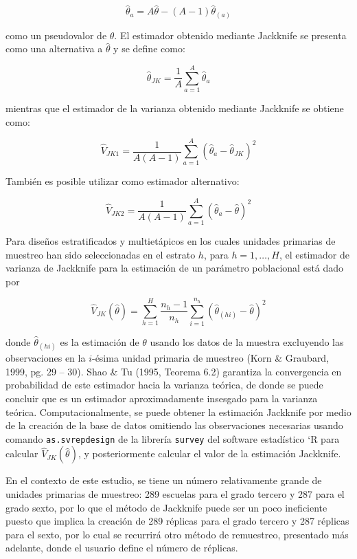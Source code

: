 \documentclass[
  12pt,
  spanish,
]{book}
\begin{document}
\[\hat{\theta}_{a}=A\hat{\theta}-(A-1)\hat{\theta}_{(a)}\]

como un pseudovalor de \(\theta\). El estimador obtenido mediante Jackknife se presenta como una alternativa a \(\hat{\theta}\) y se define como:

\[\hat{\theta}_{JK}=\dfrac{1}{A}\sum_{a=1}^{A}\hat{\theta}_{a}\]

mientras que el estimador de la varianza obtenido mediante Jackknife se obtiene como:

\[\hat{V}_{JK1}=\dfrac{1}{A(A-1)}\sum_{a=1}^{A}\left(\hat{\theta}_{a}-\hat{\theta}_{JK}\right)^{2}\]

También es posible utilizar como estimador alternativo:

\[\hat{V}_{JK2}=\dfrac{1}{A(A-1)}\sum_{a=1}^{A}\left(\hat{\theta}_{a}-\hat{\theta}\right)^{2}\]

Para diseños estratificados y multietápicos en los cuales unidades primarias de muestreo han sido seleccionadas en el estrato \(h\), para \(h=1, \ldots, H\), el estimador de varianza de Jackknife para la estimación de un parámetro poblacional está dado por

\[ \hat{V}_{JK}(\hat{\theta}) = \sum_{h=1}^H \frac{n_h - 1}{n_h} \sum_{i=1}^{n_h}
(\hat{\theta}_{(hi)}-\hat{\theta})^2\]

donde \(\hat{\theta}_{(hi)}\) es la estimación de \(\theta\) usando los datos de la muestra excluyendo las observaciones en la \(i\)-ésima unidad primaria de muestreo (Korn \& Graubard, 1999, pg. 29 -- 30). Shao \& Tu (1995, Teorema 6.2) garantiza la convergencia en probabilidad de este estimador hacia la varianza teórica, de donde se puede concluir que es un estimador aproximadamente insesgado para la varianza teórica. Computacionalmente, se puede obtener la estimación Jackknife por medio de la creación de la base de datos omitiendo las observaciones necesarias usando comando \texttt{as.svrepdesign} de la librería \texttt{survey} del software estadístico `R para calcular \(\hat{V}_{JK}(\hat{\theta})\), y posteriormente calcular el valor de la estimación Jackknife.

En el contexto de este estudio, se tiene un número relativamente grande de unidades primarias de muestreo: 289 escuelas para el grado tercero y 287 para el grado sexto, por lo que el método de Jackknife puede ser un poco ineficiente puesto que implica la creación de 289 réplicas para el grado tercero y 287 réplicas para el sexto, por lo cual se recurrirá otro método de remuestreo, presentado más adelante, donde el usuario define el número de réplicas.
\end{document}
